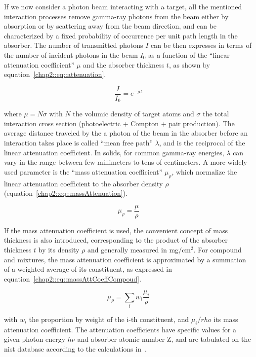 If we now consider a photon beam interacting with a target, all the mentioned interaction processes remove gamma-ray photons from the beam either by absorption or by scattering away from the beam direction, and can be characterized by a fixed probability of occurrence per unit path length in the absorber. The number of transmitted photons $I$ can be then expresses in terms of the number of incident photons in the beam $I_0$ as a function of the \enquote{linear attenuation coefficient} $\mu$ and the absorber thickness $t$, as shown by equation~\ref{chap2::eq::attenuation}.

 \begin{equation}
\frac{I}{I_0} = e^{-\mu t}
\label{chap2::eq::attenuation}
\end{equation} 

where $\mu = N\sigma$ with $N$ the volumic density of target atoms and $\sigma$ the total interaction cross section (photoelectric + Compton + pair production).
The average distance traveled by the a photon of the beam in the absorber before an interaction takes place is called \enquote{mean free path} $\lambda$, and is the reciprocal of the linear attenuation coefficient. In solids, for common gamma-ray energies, $\lambda$ can vary in the range between few millimeters to tens of centimeters. 
A more widely used parameter is the \enquote{mass attenuation coefficient} $\mu_{\rho}$, which normalize the linear attenuation coefficient to the absorber density $\rho$ (equation~\ref{chap2::eq::massAttenuation}).

\begin{equation}
\mu_{\rho} = \frac{\mu}{\rho}
\label{chap2::eq::massAttenuation}
\end{equation} 

If the mass attenuation coefficient is used, the convenient concept of mass thickness is also introduced, corresponding to the product of the absorber thickness $t$ by its density $\rho$ and generally measured in mg/cm$^2$. For compound and mixtures, the mass attenuation coefficient is approximated by a summation of a weighted average of its constituent, as expressed in equation~\ref{chap2::eq::massAttCoeffCompoud}.

 \begin{equation}
\mu_{\rho} = \sum_i{w_i\frac{\mu_i}{\rho}}
\label{chap2::eq::massAttCoeffCompoud}
\end{equation} 

with $w_i$ the proportion by weight of the i-th constituent, and $\mu_i/rho$ its mass attenuation coefficient. The attenuation coefficients have specific values for a given photon energy $h\nu$ and absorber atomic number Z, and are tabulated on the \gls{nist} database according to the calculations in~\cite{Seltzer1993}.


